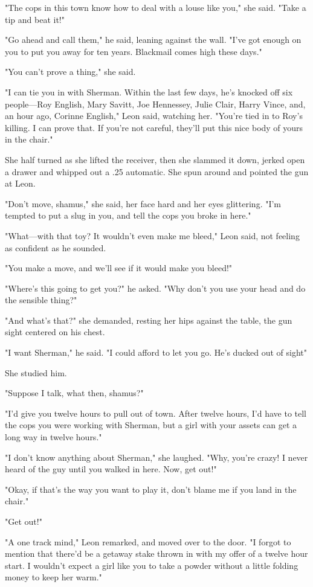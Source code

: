 \documentclass{novel}
\begin{document}
"The cops in this town know how to deal with a louse like you," she said. "Take a tip and beat it!"

"Go ahead and call them," he said, leaning against the wall. "I've got enough on you to put you away for ten years. Blackmail comes high these days."

"You can't prove a thing," she said.

"I can tie you in with Sherman. Within the last few days, he's knocked off six people—Roy English, Mary Savitt, Joe Hennessey, Julie Clair, Harry Vince, and, an hour ago, Corinne English," Leon said, watching her. "You're tied in to Roy's killing. I can prove that. If you're not careful, they'll put this nice body of yours in the chair."

She half turned as she lifted the receiver, then she slammed it down, jerked open a drawer and whipped out a .25 automatic. She spun around and pointed the gun at Leon.

"Don't move, shamus," she said, her face hard and her eyes glittering. "I'm tempted to put a slug in you, and tell the cops you broke in here."

"What—with that toy? It wouldn't even make me bleed," Leon said, not feeling as confident as he sounded.

"You make a move, and we'll see if it would make you bleed!"

"Where's this going to get you?" he asked. "Why don't you use your head and do the sensible thing?"

"And what's that?" she demanded, resting her hips against the table, the gun sight centered on his chest.

"I want Sherman," he said. "I could afford to let you go. He's ducked out of sight"

She studied him.

"Suppose I talk, what then, shamus?"

"I'd give you twelve hours to pull out of town. After twelve hours, I'd have to tell the cops you were working with Sherman, but a girl with your assets can get a long way in twelve hours."

"I don't know anything about Sherman," she laughed. "Why, you're crazy! I never heard of the guy until you walked in here. Now, get out!"

"Okay, if that's the way you want to play it, don't blame me if you land in the chair."

"Get out!"

"A one track mind," Leon remarked, and moved over to the door. "I forgot to mention that there'd be a getaway stake thrown in with my offer of a twelve hour start. I wouldn't expect a girl like you to take a powder without a little folding money to keep her warm."
\end{document}
